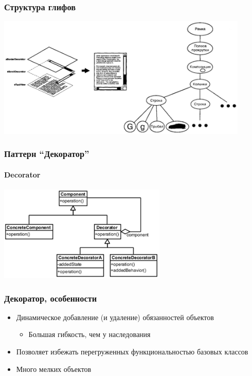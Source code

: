 \documentclass{../cscslides}
\begin{document}
    \begin{frame}
        \frametitle{Структура глифов}
        \begin{center}
            \includegraphics[width=0.9\textwidth]{glyphStructure.png}
        \end{center}
    \end{frame}

    \begin{frame}
        \frametitle{Паттерн ``Декоратор''}
        \framesubtitle{Decorator}
        \begin{center}
            \includegraphics[width=0.6\textwidth]{decorator.png}
        \end{center}
    \end{frame}

    \begin{frame}
        \frametitle{Декоратор, особенности}
        \begin{itemize}
            \item Динамическое добавление (и удаление) обязанностей объектов
            \begin{itemize}
                \item Большая гибкость, чем у наследования
            \end{itemize}
            \item Позволяет избежать перегруженных функциональностью базовых классов
            \item Много мелких объектов
        \end{itemize}
    \end{frame}
\end{document}
